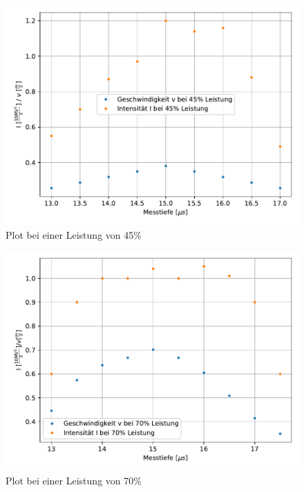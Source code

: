 \begin{figure}
    \centering
    \includegraphics[width=\textwidth]{Daten/45.pdf}
    \caption{Plot bei einer Leistung von 45\%}
    \label{fig:1}
\end{figure}

\begin{figure}
    \centering
    \includegraphics[width=\textwidth]{Daten/70.pdf}
    \caption{Plot bei einer Leistung von 70\%}
    \label{fig:2}
\end{figure}


